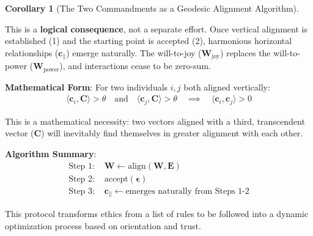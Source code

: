 \documentclass[11pt,a4paper]{article}
\theoremstyle{definition}
\newtheorem{corollary}{Corollary}[section]
\theoremstyle{remark}
\newcommand{\EE}{\mathbf{E}}
\newcommand{\WW}{\mathbf{W}}
\newcommand{\cc}{\mathbf{c}}
\begin{document}
\begin{small}
\begin{corollary}[The Two Commandments as a Geodesic Alignment Algorithm]
\begin{enumerate}[label=\textbf{\arabic*.}, leftmargin=*]
    This is a \textbf{logical consequence}, not a separate effort. Once vertical alignment is established (1) and the starting point is accepted (2), harmonious horizontal relationships (\(\cc_{\parallel}\)) emerge naturally. The will-to-joy (\(\WW_{\text{joy}}\)) replaces the will-to-power (\(\WW_{\text{power}}\)), and interactions cease to be zero-sum. 
    
    \textbf{Mathematical Form}: For two individuals \(i, j\) both aligned vertically:
    \begin{align}
    \langle \cc_i, \mathbf{C} \rangle > \theta \quad \text{and} \quad \langle \cc_j, \mathbf{C} \rangle > \theta \quad \implies \quad \langle \cc_i, \cc_j \rangle > 0
    \end{align}
    
    This is a mathematical necessity: two vectors aligned with a third, transcendent vector (\(\mathbf{C}\)) will inevitably find themselves in greater alignment with each other.
\end{enumerate}

\textbf{Algorithm Summary}:
\begin{align}
\text{Step 1: } &\WW \gets \text{align}(\WW, \EE) \\
\text{Step 2: } &\text{accept}(\boldsymbol{\epsilon}) \\
\text{Step 3: } &\cc_{\parallel} \gets \text{emerges naturally from Steps 1-2}
\end{align}

This protocol transforms ethics from a list of rules to be followed into a dynamic optimization process based on orientation and trust.
\end{corollary}

\begin{figure}[H]
\centering
{}
\end{figure}
\end{small}
\end{document}

